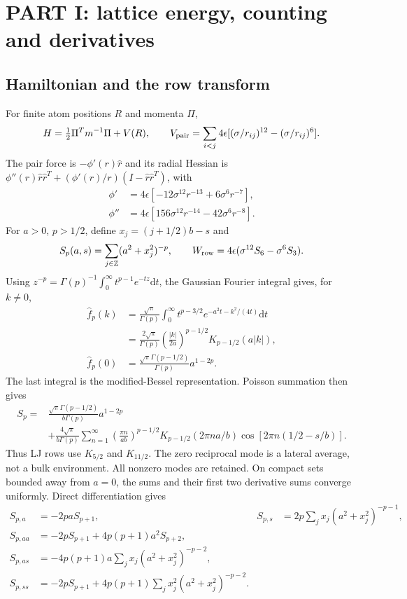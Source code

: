 \documentclass[11pt]{article}
\newcommand{\dd}{\mathrm d}
\begin{document}
\section{PART I: lattice energy, counting and derivatives}
\subsection{Hamiltonian and the row transform}
For finite atom positions $R$ and momenta $\Pi$,
\begin{equation}
H=\tfrac12\Pi^Tm^{-1}\Pi+V(R),\qquad
V_{\rm pair}=\sum_{i<j}4\epsilon
 [(\sigma/r_{ij})^{12}-(\sigma/r_{ij})^6].
\end{equation}
The pair force is $-\phi'(r)\widehat r$ and its radial Hessian is
$\phi''(r)\widehat r\widehat r^T+
(\phi'(r)/r)(I-\widehat r\widehat r^T)$, with
\begin{align}
\phi'&=4\epsilon[-12\sigma^{12}r^{-13}+6\sigma^6r^{-7}],\\
\phi''&=4\epsilon[156\sigma^{12}r^{-14}-42\sigma^6r^{-8}].
\end{align}
For $a>0$, $p>1/2$, define $x_j=(j+1/2)b-s$ and
\begin{equation}
S_p(a,s)=\sum_{j\in\mathbb Z}(a^2+x_j^2)^{-p},\qquad
W_{\rm row}=4\epsilon(\sigma^{12}S_6-\sigma^6S_3).
\end{equation}
Using $z^{-p}=\Gamma(p)^{-1}\int_0^\infty t^{p-1}e^{-tz}\dd t$,
the Gaussian Fourier integral gives, for $k\ne0$,
\begin{align}
\widehat f_p(k)&=\frac{\sqrt\pi}{\Gamma(p)}
 \int_0^\infty t^{p-3/2}e^{-a^2t-k^2/(4t)}\dd t\\
 &=\frac{2\sqrt\pi}{\Gamma(p)}
 \left(\frac{|k|}{2a}\right)^{p-1/2}K_{p-1/2}(a|k|),\\
\widehat f_p(0)&=\frac{\sqrt\pi\Gamma(p-1/2)}{\Gamma(p)}a^{1-2p}.
\end{align}
The last integral is the modified-Bessel representation\cite{DLMF}.
Poisson summation then gives
\begin{align}
S_p={}&\frac{\sqrt\pi\Gamma(p-1/2)}{b\Gamma(p)}a^{1-2p}\nonumber\\
&+\frac{4\sqrt\pi}{b\Gamma(p)}\sum_{n=1}^\infty
 \left(\frac{\pi n}{ab}\right)^{p-1/2}
 K_{p-1/2}(2\pi na/b)\cos[2\pi n(1/2-s/b)].
\label{eq:row}
\end{align}
Thus LJ rows use $K_{5/2}$ and $K_{11/2}$. The zero reciprocal mode is a
lateral average, not a bulk environment. All nonzero modes are retained.
On compact sets bounded away from $a=0$, the sums and their first two
derivative sums converge uniformly. Direct differentiation gives
\begin{align}
S_{p,a}&=-2paS_{p+1},& S_{p,s}&=2p\sum_j x_j(a^2+x_j^2)^{-p-1},\\
S_{p,aa}&=-2pS_{p+1}+4p(p+1)a^2S_{p+2},\nonumber\\
S_{p,as}&=-4p(p+1)a\sum_jx_j(a^2+x_j^2)^{-p-2},\nonumber\\
S_{p,ss}&=-2pS_{p+1}+4p(p+1)\sum_jx_j^2(a^2+x_j^2)^{-p-2}.
\end{align}
\end{document}
